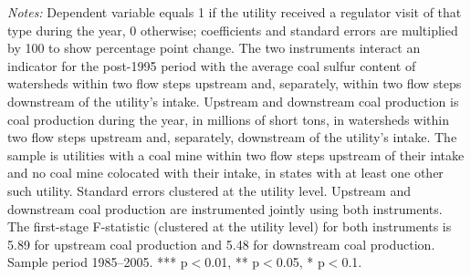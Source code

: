 \begin{table}[htbp]
\begin{minipage}{\linewidth}
\textit{Notes:} Dependent variable equals 1 if the utility received a regulator visit of that type during the year, 0 otherwise; coefficients and standard errors are multiplied by 100 to show percentage point change. The two instruments interact an indicator for the post-1995 period with the average coal sulfur content of watersheds within two flow steps upstream and, separately, within two flow steps downstream of the utility's intake. Upstream and downstream coal production is coal production during the year, in millions of short tons, in watersheds within two flow steps upstream and, separately, downstream of the utility's intake. The sample is utilities with a coal mine within two flow steps upstream of their intake and no coal mine colocated with their intake, in states with at least one other such utility. Standard errors clustered at the utility level. Upstream and downstream coal production are instrumented jointly using both instruments. The first-stage F-statistic (clustered at the utility level) for both instruments is 5.89 for upstream coal production and 5.48 for downstream coal production. Sample period 1985--2005. *** p$<$0.01, ** p$<$0.05, * p$<$0.1.
\end{minipage}
\end{table}
